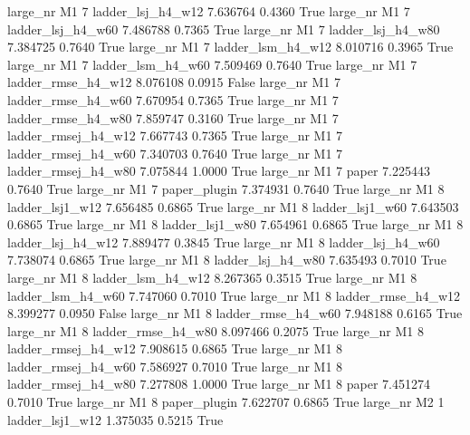   large_nr       M1                 7   ladder_lsj_h4_w12   7.636764      0.4360    True
  large_nr       M1                 7   ladder_lsj_h4_w60   7.486788      0.7365    True
  large_nr       M1                 7   ladder_lsj_h4_w80   7.384725      0.7640    True
  large_nr       M1                 7   ladder_lsm_h4_w12   8.010716      0.3965    True
  large_nr       M1                 7   ladder_lsm_h4_w60   7.509469      0.7640    True
  large_nr       M1                 7  ladder_rmse_h4_w12   8.076108      0.0915   False
  large_nr       M1                 7  ladder_rmse_h4_w60   7.670954      0.7365    True
  large_nr       M1                 7  ladder_rmse_h4_w80   7.859747      0.3160    True
  large_nr       M1                 7 ladder_rmsej_h4_w12   7.667743      0.7365    True
  large_nr       M1                 7 ladder_rmsej_h4_w60   7.340703      0.7640    True
  large_nr       M1                 7 ladder_rmsej_h4_w80   7.075844      1.0000    True
  large_nr       M1                 7               paper   7.225443      0.7640    True
  large_nr       M1                 7        paper_plugin   7.374931      0.7640    True
  large_nr       M1                 8     ladder_lsj1_w12   7.656485      0.6865    True
  large_nr       M1                 8     ladder_lsj1_w60   7.643503      0.6865    True
  large_nr       M1                 8     ladder_lsj1_w80   7.654961      0.6865    True
  large_nr       M1                 8   ladder_lsj_h4_w12   7.889477      0.3845    True
  large_nr       M1                 8   ladder_lsj_h4_w60   7.738074      0.6865    True
  large_nr       M1                 8   ladder_lsj_h4_w80   7.635493      0.7010    True
  large_nr       M1                 8   ladder_lsm_h4_w12   8.267365      0.3515    True
  large_nr       M1                 8   ladder_lsm_h4_w60   7.747060      0.7010    True
  large_nr       M1                 8  ladder_rmse_h4_w12   8.399277      0.0950   False
  large_nr       M1                 8  ladder_rmse_h4_w60   7.948188      0.6165    True
  large_nr       M1                 8  ladder_rmse_h4_w80   8.097466      0.2075    True
  large_nr       M1                 8 ladder_rmsej_h4_w12   7.908615      0.6865    True
  large_nr       M1                 8 ladder_rmsej_h4_w60   7.586927      0.7010    True
  large_nr       M1                 8 ladder_rmsej_h4_w80   7.277808      1.0000    True
  large_nr       M1                 8               paper   7.451274      0.7010    True
  large_nr       M1                 8        paper_plugin   7.622707      0.6865    True
  large_nr       M2                 1     ladder_lsj1_w12   1.375035      0.5215    True
